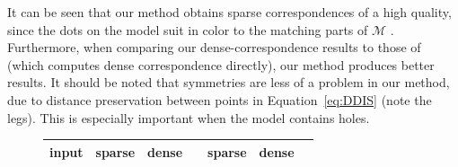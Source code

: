 \documentclass[10pt,twocolumn,letterpaper]{article}
\begin{document}
It can be seen that our method obtains sparse correspondences of a high quality, since the dots on the model suit in color to the matching parts of $\mathcal{M}$ .
Furthermore, when comparing our dense-correspondence results to those of~\cite{rodola2017partial} (which computes dense correspondence directly), our method produces better results.
It should be noted that symmetries are less of a problem in our method, due to distance preservation between points in Equation~\eqref{eq:DDIS} (note the legs).
This is especially important when the model contains holes.
\begin{figure}[htb]

	\centering
		\setlength\tabcolsep{0.5pt}
	\begin{tabular}[width=0.8\textwidth]{c|ccc|ccc}
	     input & sparse & dense &  \cite{rodola2017partial}
	           & sparse & dense & \cite{rodola2017partial}\\ \hline

\end{tabular}
\end{figure}
\end{document}
